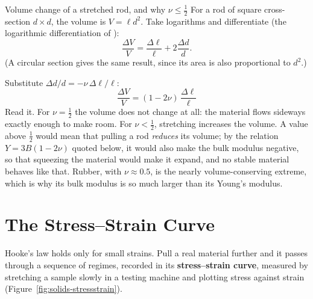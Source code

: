\begin{derivbox}{Volume change of a stretched rod, and why $\nu\le\tfrac12$}
 For a rod of square cross-section $d\times d$, the volume is $V=\ell d^{2}$. Take logarithms and
differentiate (the logarithmic differentiation of ):
\[
\frac{\Delta V}{V}=\frac{\Delta\ell}{\ell}+2\frac{\Delta d}{d}.
\]
(A circular section gives the same result, since its area is also proportional to $d^{2}$.)

 Substitute $\Delta d/d=-\nu\,\Delta\ell/\ell$:
\[
\boxed{\;\frac{\Delta V}{V}=(1-2\nu)\,\frac{\Delta\ell}{\ell}\;}
\]
 Read it. For $\nu=\tfrac12$ the volume does not change at all: the material flows sideways
exactly enough to make room. For $\nu<\tfrac12$, stretching increases the volume. A value above
$\tfrac12$ would mean that pulling a rod \emph{reduces} its volume; by the relation $Y=3B(1-2\nu)$ quoted
below, it would also make the bulk modulus negative, so that squeezing the material would make it expand,
and no stable material behaves like that. Rubber, with $\nu\approx0.5$, is the nearly volume-conserving
extreme, which is why its bulk modulus is so much larger than its Young's modulus.
\end{derivbox}


\section{The Stress--Strain Curve}\label{sec:solids-curve}

Hooke's law holds only for small strains. Pull a real material further and it passes through a sequence
of regimes, recorded in its \textbf{stress--strain curve}, measured by stretching a sample slowly in a
testing machine and plotting stress against strain (Figure~\ref{fig:solids-stressstrain}).

